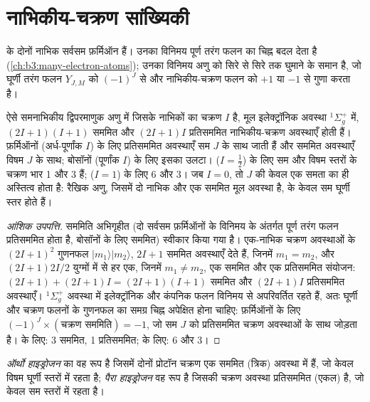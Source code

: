 \section{नाभिकीय-चक्रण सांख्यिकी}

 के दोनों नाभिक सर्वसम फ़र्मिऑन हैं। उनका विनिमय पूर्ण तरंग फलन का चिह्न
बदल देता है (\cref{ch:b3:many-electron-atoms}); उनका विनिमय
अणु को सिरे से सिरे तक घुमाने के समान है, जो घूर्णी
तरंग फलन $Y_{J,M}$ को $(-1)^J$ से और नाभिकीय-चक्रण फलन को $+1$ या $-1$ से गुणा करता है।

\begin{theorem}[नाभिकीय-चक्रण सांख्यिकी]\label{thm:b3:statistical-thermo-applied:spin-statistics}
ऐसे समनाभिकीय द्विपरमाणुक अणु में जिसके नाभिकों का चक्रण $I$ है, मूल
इलेक्ट्रॉनिक अवस्था ${}^1\Sigma_g^+$ में, $(2I+1)(I+1)$ सममित और $(2I+1)I$
प्रतिसममित नाभिकीय-चक्रण अवस्थाएँ होती हैं। फ़र्मिऑनों (अर्ध-पूर्णांक $I$) के लिए
प्रतिसममित अवस्थाएँ सम $J$ के साथ जाती हैं और सममित अवस्थाएँ विषम $J$ के साथ; बोसॉनों
(पूर्णांक $I$) के लिए इसका उलटा।  ($I = \frac12$) के लिए सम और विषम स्तरों के
चक्रण भार 1 और 3 हैं;  ($I = 1$) के लिए 6 और 3। जब $I = 0$, तो $J$ की केवल एक
समता का ही अस्तित्व होता है: रैखिक  अणु, जिसमें दो  नाभिक और एक
सममित मूल अवस्था है, के केवल सम घूर्णी स्तर होते हैं।
\end{theorem}

\begin{proof}[आंशिक उपपत्ति]
सममिति अभिगृहीत (दो सर्वसम फ़र्मिऑनों के विनिमय के अंतर्गत पूर्ण तरंग फलन
प्रतिसममित होता है, बोसॉनों के लिए सममित) स्वीकार किया गया है। एक-नाभिक चक्रण अवस्थाओं
के $(2I+1)^2$ गुणनफल $|m_1\rangle|m_2\rangle$, $2I+1$ सममित
अवस्थाएँ देते हैं, जिनमें $m_1 = m_2$, और $(2I+1)2I/2$ युग्मों में से हर एक, जिनमें $m_1 \ne m_2$, एक
सममित और एक प्रतिसममित संयोजन: $(2I+1) + (2I+1)I = (2I+1)(I+1)$
सममित और $(2I+1)I$ प्रतिसममित अवस्थाएँ। ${}^1\Sigma_g^+$ अवस्था में इलेक्ट्रॉनिक
और कंपनिक फलन विनिमय से अपरिवर्तित रहते हैं, अतः
घूर्णी और चक्रण फलनों के गुणनफल का समग्र चिह्न अपेक्षित होना चाहिए:
फ़र्मिऑनों के लिए $(-1)^J \times(\text{चक्रण सममिति}) = -1$, जो सम $J$ को
प्रतिसममित चक्रण अवस्थाओं के साथ जोड़ता है।  के लिए: 3 सममित, 1 प्रतिसममित;  के लिए: 6 और
3।
\end{proof}

\begin{definition}[ऑर्थो और पैरा हाइड्रोजन]\label{def:b3:statistical-thermo-applied:spin-isomers}
\emph{ऑर्थो हाइड्रोजन}  का वह रूप है जिसमें दोनों
प्रोटॉन चक्रण एक सममित (त्रिक) अवस्था में हैं, जो केवल विषम
घूर्णी स्तरों में रहता है; \emph{पैरा हाइड्रोजन} वह रूप है जिसकी
चक्रण अवस्था प्रतिसममित (एकल) है, जो केवल सम स्तरों में रहता है।
\end{definition}

